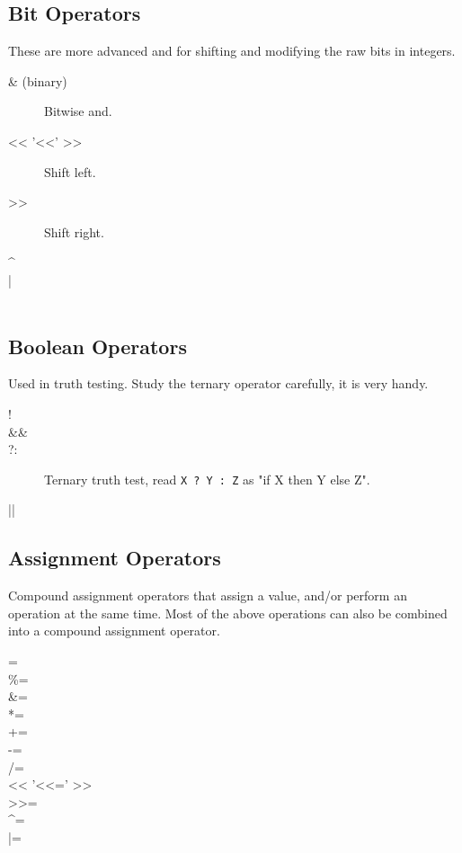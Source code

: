 \subsection{Bit Operators}

These are more advanced and for shifting and modifying the 
raw bits in integers.

\begin{description}
\item[\& (binary)] Bitwise and.
\item[<< '<<' >>] Shift left.
\item[>>] Shift right.
\item[\^{}]
\item[|]
\item[~]
\end{description}


\subsection{Boolean Operators}

Used in truth testing.  Study the ternary
operator carefully, it is very handy.

\begin{description}
\item[!]
\item[\&\&]
\item[?:] Ternary truth test, read \verb|X ? Y : Z| as "if X then Y else Z".
\item[||]
\end{description}

\subsection{Assignment Operators}

Compound assignment operators that assign a value, and/or perform
an operation at the same time.  Most of the above operations
can also be combined into a compound assignment operator.

\begin{description}
\item[=]
\item[\%=]
\item[\&=]
\item[*=]
\item[+=]
\item[-=]
\item[/=]
\item[<< '<<=' >>]
\item[>>=]
\item[\^{}=]
\item[|=]
\end{description}

